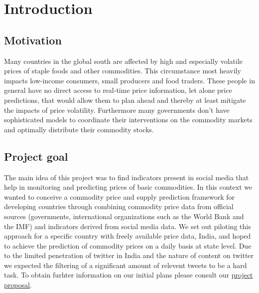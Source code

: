 \section*{Introduction}
\subsection*{Motivation}
Many countries in the global south are affected by high and especially volatile prices of staple foods and other commodities. This circumstance most heavily impacts low-income consumers, small producers and food traders. These people in general have no direct access to real-time price information, let alone price predictions, that would allow them to plan ahead and thereby at least mitigate the impacts of price volatility. Furthermore many governments don't have sophisticated models to coordinate their interventions on the commodity markets and optimally distribute their commodity stocks.

\subsection*{Project goal}
The main idea of this project was to find indicators present in social media that help in monitoring and predicting prices of basic commodities. In this context we wanted to conceive a commodity price and supply prediction framework for developing countries through combining commodity price data from official sources (governments, international organizations such as the World Bank and the IMF) and indicators derived from social media data. We set out piloting this approach for a specific country with freely available price data, India, and hoped to achieve the prediction of commodity prices on a daily basis at state level. Due to the limited penetration of twitter in India and the nature of content on twitter we expected the filtering of a significant amount of relevent tweets to be a hard task. To obtain furhter information on our initial plans please consult our \href{http://wiki.epfl.ch/predicting-commodity-prices.big-data/proposal}{project proposal}.
